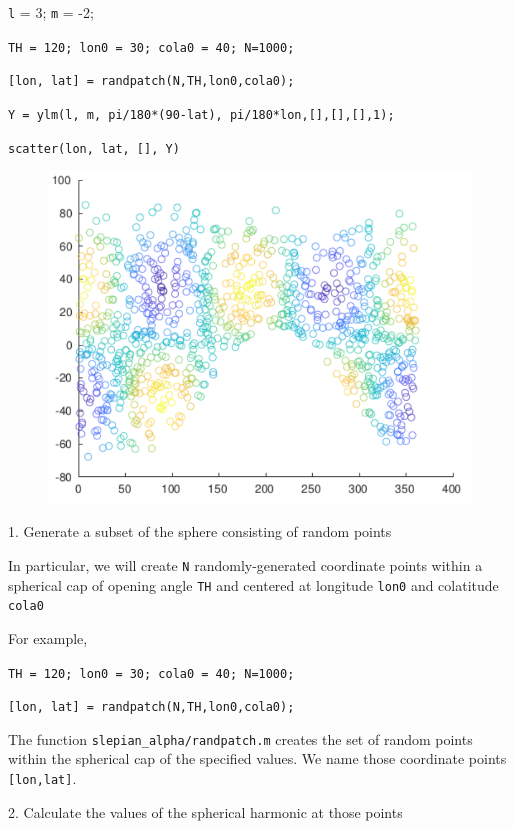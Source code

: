 \documentclass{article}
\begin{document}
\setlength{\parskip}{.1mm}

\verb+l+ = 3; \verb+m+ = -2;

\verb+TH = 120; lon0 = 30; cola0 = 40; N=1000;+

\verb+[lon, lat] = randpatch(N,TH,lon0,cola0);+

\verb+Y = ylm(l, m, pi/180*(90-lat), pi/180*lon,[],[],[],1);+

\verb+scatter(lon, lat, [], Y)+

\begin{figure}[H]
\includegraphics[scale=.75]{random_plot}
\end{figure}

\setlength{\parskip}{0.5cm plus4mm minus3mm}

1. Generate a subset of the sphere consisting of random points 

In particular, we will create \verb+N+ randomly-generated coordinate points within a spherical cap of opening angle \verb+TH+ and centered at longitude \verb+lon0+ and colatitude \verb+cola0+

For example, 

\verb+TH = 120; lon0 = 30; cola0 = 40; N=1000;+

\verb+[lon, lat] = randpatch(N,TH,lon0,cola0);+

The function \verb+slepian_alpha/randpatch.m+ creates the set of random points within the spherical cap of the specified values. We name those coordinate points \verb+[lon,lat]+.

2. Calculate the values of the spherical harmonic at those points
\end{document}
